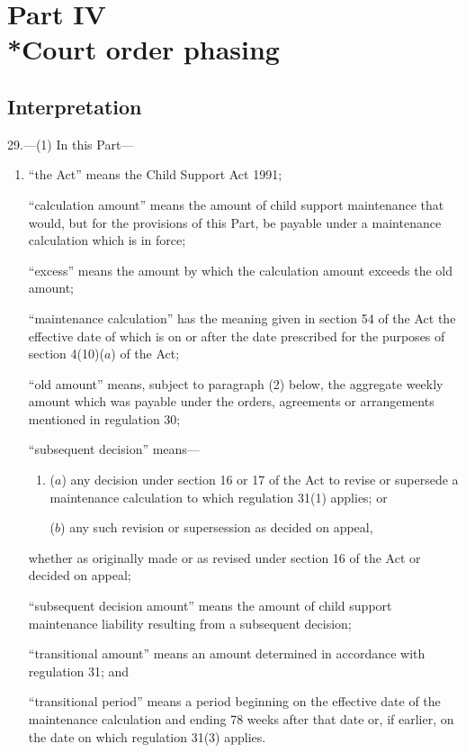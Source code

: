 \documentclass[12pt,a4paper]{article}
\begin{document}

\section[Part IV --- Court order phasing]{Part IV\\*Court order phasing}

\renewcommand\parthead{--- Part IV}

\subsection[29. Interpretation]{Interpretation}

29.---(1)  In this Part—
\begin{enumerate}\item[]
“the Act” means the Child Support Act 1991;

“calculation amount” means the amount of child support maintenance that would, but for the provisions of this Part, be payable under a maintenance calculation which is in force;

“excess” means the amount by which the calculation amount exceeds the old amount;

“maintenance calculation” has the meaning given in section 54 of the Act the effective date of which is on or after the date prescribed for the purposes of section 4(10)($a$)  of the Act;

“old amount” means, subject to paragraph (2) below, the aggregate weekly amount which was payable under the orders, agreements or arrangements mentioned in regulation 30;

“subsequent decision” means—
\begin{enumerate}\item[]
($a$) 
any decision under section 16 or 17 of the Act to revise or supersede a maintenance calculation to which regulation 31(1) applies; or

($b$) 
any such revision or supersession as decided on appeal,
\end{enumerate}
whether as originally made or as revised under section 16 of the Act or decided on appeal;

“subsequent decision amount” means the amount of child support maintenance liability resulting from a subsequent decision;

“transitional amount” means an amount determined in accordance with regulation 31; and

“transitional period” means a period beginning on the effective date of the maintenance calculation and ending 78 weeks after that date or, if earlier, on the date on which regulation 31(3) applies.
\end{enumerate}
\end{document}
